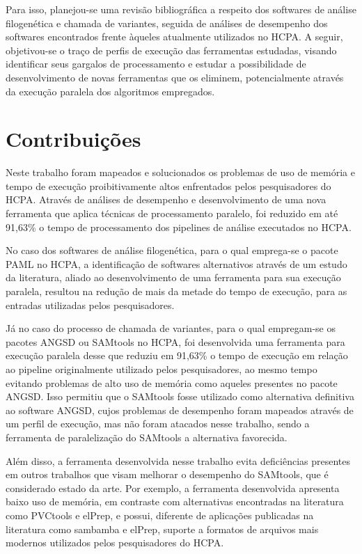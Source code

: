 \documentclass[cic,tc]{iiufrgs}
\begin{document}
Para isso, planejou-se uma revisão bibliográfica a respeito dos softwares de
análise filogenética e chamada de variantes, seguida de análises de desempenho
dos softwares encontrados frente àqueles atualmente utilizados no HCPA. A
seguir, objetivou-se o traço de perfis de execução das ferramentas estudadas,
visando identificar seus gargalos de processamento e estudar a possibilidade de
desenvolvimento de novas ferramentas que os eliminem, potencialmente através da
execução paralela dos algoritmos empregados.

%
%
\section{Contribuições}

Neste trabalho foram mapeados e solucionados os problemas de uso de memória e
tempo de execução proibitivamente altos enfrentados pelos pesquisadores do HCPA.
Através de análises de desempenho e desenvolvimento de uma nova ferramenta que
aplica técnicas de processamento paralelo, foi reduzido em até 91,63\% o tempo
de processamento dos pipelines de análise executados no HCPA.

No caso dos softwares de análise filogenética, para o qual emprega-se o pacote
PAML no HCPA, a identificação de softwares alternativos através de um estudo da
literatura, aliado ao desenvolvimento de uma ferramenta para sua execução
paralela, resultou na redução de mais da metade do tempo de execução, para as
entradas utilizadas pelos pesquisadores.

Já no caso do processo de chamada de variantes, para o qual empregam-se os
pacotes ANGSD ou SAMtools no HCPA, foi desenvolvida uma ferramenta para
execução paralela desse que reduziu em 91,63\% o tempo de execução em relação
ao pipeline originalmente utilizado pelos pesquisadores, ao mesmo tempo
evitando problemas de alto uso de memória como aqueles presentes no pacote
ANGSD. Isso permitiu que o SAMtools fosse utilizado como alternativa definitiva
ao software ANGSD, cujos problemas de desempenho foram mapeados através de um
perfil de execução, mas não foram atacados nesse trabalho, sendo a ferramenta
de paralelização do SAMtools a alternativa favorecida.

Além disso, a ferramenta desenvolvida nesse trabalho evita deficiências
presentes em outros trabalhos que visam melhorar o desempenho do SAMtools, que
é considerado estado da arte. Por exemplo, a ferramenta desenvolvida apresenta
baixo uso de memória, em contraste com alternativas encontradas na literatura
como PVCtools e elPrep, e possui, diferente de aplicações publicadas na
literatura como sambamba e elPrep, suporte a formatos de arquivos mais modernos
utilizados pelos pesquisadores do HCPA.
\end{document}
